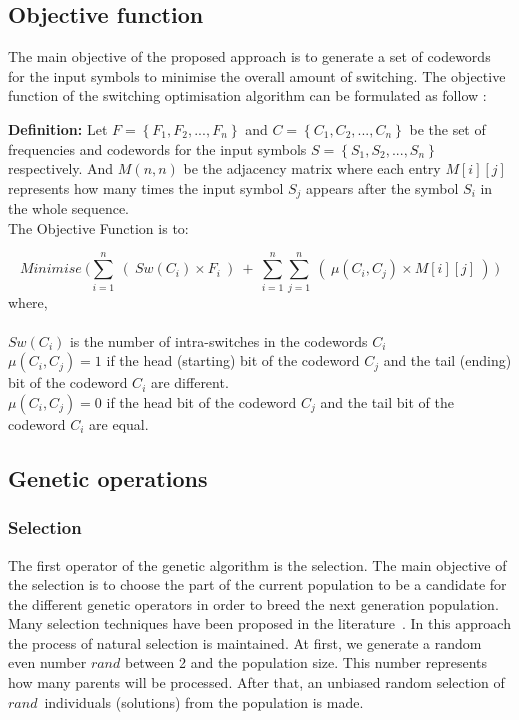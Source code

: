 \documentclass[preprint,12pt]{elsarticle}
\begin{document}
\subsection{Objective function}

The main objective of the proposed approach is to generate a set of codewords for the input symbols to minimise the overall amount of switching. The objective function of the switching optimisation algorithm can be formulated as follow :

\textbf{Definition:} Let $F=\left\{F_{1},F_{2},...,F_{n}\right\}$ and $C=\left\{C_{1},C_{2},...,C_{n}\right\}$ be the set of frequencies and codewords for the input symbols $S=\left\{S_{1},S_{2},...,S_{n}\right\}$ respectively. And $M(n,n)$ be the adjacency matrix where each entry $M[i][j]$ represents how many times the input symbol $S_j$ appears after the symbol $S_i$ in the whole sequence.
\\
The Objective Function is to: 

\begin{equation}
Minimise~\Big( \sum_{i=1}^{n}~(~Sw(C_{i}) \times F_{i}~)~+~\sum_{i=1}^{n}\sum_{j=1}^{n}~(~\mu(C_{i},C_{j}) \times M[i][j]~)~\Big)  
\end{equation}
where,\\\\
$Sw(C_{i})$ is the number of intra-switches in the codewords $C_{i}$\\
$\mu(C_{i},C_{j})=1$ if the head (starting) bit of the codeword $C_{j}$ and the tail (ending) bit of the codeword $C_{i}$ are different.\\
$\mu(C_{i},C_{j})=0$ if the head bit of the codeword $C_{j}$ and the tail bit of the codeword $C_{i}$ are equal.


\subsection{Genetic operations}
\subsubsection{Selection}
The first operator of the genetic algorithm is the selection. The main objective of the selection is to choose the part of the current  population to be a candidate for the different genetic operators in order to breed the next generation population. Many selection techniques have been proposed in the literature~\cite{bli95}. In this approach the  process of natural selection is maintained. At first, we generate a random even number \textit{$rand$} between 2 and the population size. This number represents how many parents will be processed. After that, an unbiased random selection of \textit{$rand$}~individuals (solutions) from the population is made. 
\end{document}
